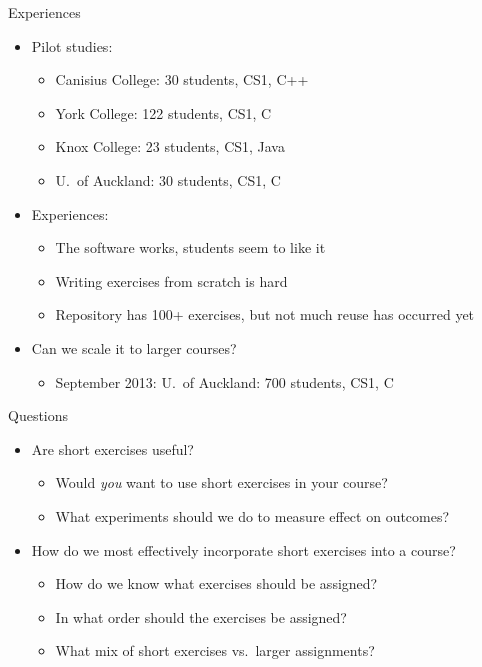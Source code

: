 \documentclass{beamer}
\begin{document}
\begin{frame}{Experiences}

\begin{itemize}
\item Pilot studies:
  \begin{itemize}
  \item Canisius College: 30 students, CS1, C++
  \item York College: 122 students, CS1, C
  \item Knox College: 23 students, CS1, Java
  \item U.\ of Auckland: 30 students, CS1, C
  \end{itemize}
\item Experiences:
  \begin{itemize}
  \item The software works, students seem to like it
  \item Writing exercises from scratch is hard
  \item Repository has 100+ exercises, but not much reuse has occurred yet
  \end{itemize}
\item Can we scale it to larger courses?
  \begin{itemize}
\item September 2013: U.\ of Auckland: 700 students, CS1, C
  \end{itemize}
\end{itemize}

\end{frame}


\begin{frame}{Questions}

\begin{itemize}
\item Are short exercises useful?
  \begin{itemize}
  \item Would {\em you} want to use short exercises in your course?
  \item What experiments should we do to measure effect on outcomes?
  \end{itemize}
\item How do we most effectively incorporate short exercises into a course?
  \begin{itemize}
  \item How do we know what exercises should be assigned?
  \item In what order should the exercises be assigned?
  \item What mix of short exercises vs.\ larger assignments?
  \end{itemize}
\end{itemize}

\end{frame}
\end{document}
